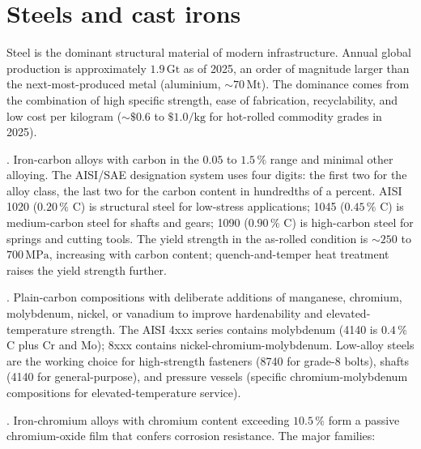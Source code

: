 \section{Steels and cast irons}

Steel is the dominant structural material of modern infrastructure.
Annual global production is approximately $1.9\,\text{Gt}$ as of
2025, an order of magnitude larger than the next-most-produced
metal (aluminium, $\sim 70\,\text{Mt}$). The dominance comes from
the combination of high specific strength, ease of fabrication,
recyclability, and low cost per kilogram ($\sim \$0.6$ to $\$1.0/
\text{kg}$ for hot-rolled commodity grades in 2025).

. Iron-carbon alloys with carbon in
the $0.05$ to $1.5\,\%$ range and minimal other alloying. The
AISI/SAE designation system uses four digits: the first two for the
alloy class, the last two for the carbon content in hundredths of a
percent. AISI 1020 ($0.20\,\%$ C) is structural steel for low-stress
applications; 1045 ($0.45\,\%$ C) is medium-carbon steel for shafts
and gears; 1090 ($0.90\,\%$ C) is high-carbon steel for springs and
cutting tools. The yield strength in the as-rolled condition is
$\sim 250$ to $700\,\text{MPa}$, increasing with carbon content;
quench-and-temper heat treatment raises the yield strength further.

. Plain-carbon compositions with deliberate
additions of manganese, chromium, molybdenum, nickel, or vanadium
to improve hardenability and elevated-temperature strength. The AISI
4xxx series contains molybdenum (4140 is $0.4\,\%$ C plus Cr and Mo);
8xxx contains nickel-chromium-molybdenum. Low-alloy steels are the
working choice for high-strength fasteners (8740 for grade-8 bolts),
shafts (4140 for general-purpose), and pressure vessels (specific
chromium-molybdenum compositions for elevated-temperature service).

. Iron-chromium alloys with chromium content
exceeding $10.5\,\%$ form a passive chromium-oxide film that confers
corrosion resistance. The major families:

